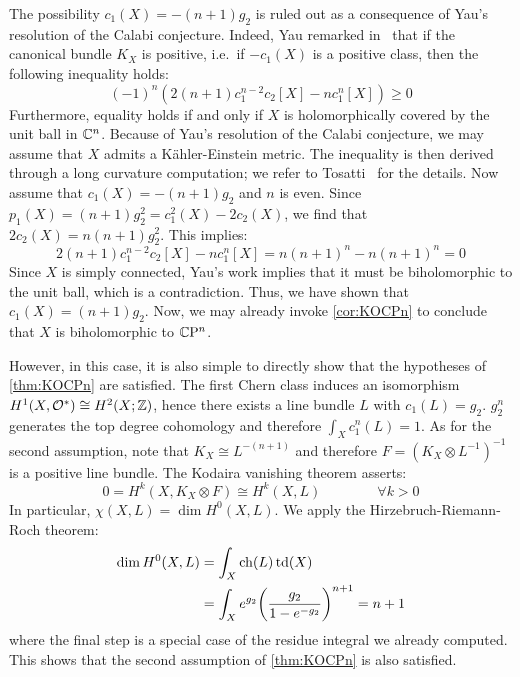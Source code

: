 \begin{myproof}
	The possibility $c_1(X)=-(n+1)g_2$ is ruled out as a consequence of Yau's resolution of the Calabi conjecture. Indeed, Yau remarked in~\cite{Yau1977} that if the canonical bundle $K_X$ is positive, i.e.~if $-c_1(X)$ is a positive class, then the following inequality holds:
	\begin{equation*}
		(-1)^n (2(n+1) c_1^{n-2}c_2[X]-n c_1^n[X])\geq 0
	\end{equation*}
	Furthermore, equality holds if and only if $X$ is holomorphically covered by the unit ball in $\mathbb{C}^n$. Because of Yau's resolution of the Calabi conjecture, we may assume that $X$ admits a K\"ahler-Einstein metric. The inequality is then derived through a long curvature computation; we refer to Tosatti~\cite{Tos2017} for the details. Now assume that $c_1(X)=-(n+1)g_2$ and $n$ is even. Since $p_1(X)=(n+1)g_2^2=c_1^2(X)-2c_2(X)$, we find that $2c_2(X)=n(n+1)g_2^2$. This implies:
	\begin{equation*}
		2(n+1)c_1^{n-2}c_2[X]-nc_1^n[X]=n(n+1)^n-n(n+1)^n=0
	\end{equation*}
	Since $X$ is simply connected, Yau's work implies that it must be biholomorphic to the unit ball, which is a contradiction. Thus, we have shown that $c_1(X)=(n+1)g_2$. Now, we may already invoke \cref{cor:KOCPn} to conclude that $X$ is biholomorphic to $\mathbb{C}\mathrm{P}^n$. 
	
	However, in this case, it is also simple to directly show that the hypotheses of \cref{thm:KOCPn} are satisfied. The first Chern class induces an isomorphism $H^1(X,\mathcal{O}^*)\cong H^2(X;\mathbb{Z})$, hence there exists a line bundle $L$ with $c_1(L)=g_2$. $g_2^n$ generates the top degree cohomology and therefore $\int_X c_1^n(L)=1$. As for the second assumption, note that $K_X\cong L^{-(n+1)}$ and therefore $F=(K_X\otimes L^{-1})^{-1}$ is a positive line bundle. The Kodaira vanishing theorem asserts:
	\begin{equation*}
		0=H^k(X,K_X\otimes F)\cong H^k(X,L) \qquad\qquad \forall k>0
	\end{equation*} 
	In particular, $\chi(X,L)=\dim H^0(X,L)$. We apply the Hirzebruch-Riemann-Roch theorem:
	\begin{align*}
		\dim H^0(X,L)&=\int_X \operatorname{ch}(L)\operatorname{td}(X)\\
		&=\int_X e^{g_2}\bigg(\frac{g_2}{1-e^{-g_2}}\bigg)^{n+1}=n+1
	\end{align*}
	where the final step is a special case of the residue integral we already computed. This shows that the second assumption of \cref{thm:KOCPn} is also satisfied.
\end{myproof}

